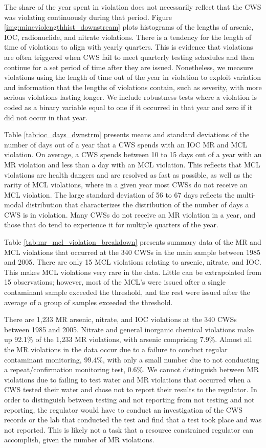 \documentclass{article}
\begin{document}
The share of the year spent in violation does not necessarily reflect that the CWS was violating continuously during that period. Figure \ref{img:mineviolengthhist_downstream} plots histograms of the lengths of arsenic, IOC, radionuclide, and nitrate violations. There is a tendency for the length of time of violations to align with yearly quarters. This is evidence that violations are often triggered when CWS fail to meet quarterly testing schedules and then continue for a set period of time after they are issued. Nonetheless, we measure violations using the length of time out of the year in violation to exploit variation and information that the lengths of violations contain, such as severity, with more serious violations lasting longer. We include robustness tests where a violation is coded as a binary variable equal to one if it occurred in that year and zero if it did not occur in that year.

Table \ref{tab:ioc_days_dwnstrm} presents means and standard deviations of the number of days out of a year that a CWS spends with an IOC MR and MCL violation. On average, a CWS spends between 10 to 15 days out of a year with an MR violation and less than a day with an MCL violation. This reflects that MCL violations are health dangers and are resolved as fast as possible, as well as the rarity of MCL violations, where in a given year most CWSs do not receive an MCL violation. The large standard deviation of 56 to 67 days reflects the multi-modal distribution that characterizes the distribution of the number of days a CWS is in violation. Many CWSs do not receive an MR violation in a year, and those that do tend to experience it for multiple quarters of the year. 

Table \ref{tab:mr_mcl_violation_breakdown} presents summary data of the MR and MCL violations that occurred at the 340 CWSs in the main sample between 1985 and 2005. There are only 15 MCL violations relating to arsenic, nitrate, and IOC. This makes MCL violations very rare in the data. Little can be extrapolated from 15 observations; however, most of the MCL's were issued after a single contaminant sample exceeded the threshold, and the rest were issued after the average of a group of samples exceeded the threshold.

There are 1,233 MR arsenic, nitrate, and IOC violations at the 340 CWSs between 1985 and 2005. Nitrate and general inorganic chemical violations make up 92.1\% of the 1,233 MR violations, with arsenic comprising 7.9\%. Almost all the MR violations in the data occur due to a failure to conduct regular contaminant monitoring, 99.4\%, with only a small number due to not conducting a repeat/confirmation monitoring test, 0.6\%. We cannot distinguish between MR violations due to failing to test water and MR violations that occurred when a CWS tested their water and chose not to report their results to the regulator. In order to distinguish between testing and not reporting from not testing and not reporting, the regulator would have to conduct an investigation of the CWS records or the lab that conducted the test and find that a test took place and was not reported. This is likely not a task that a resource constrained regulator can accomplish, given the number of MR violations.
\end{document}
